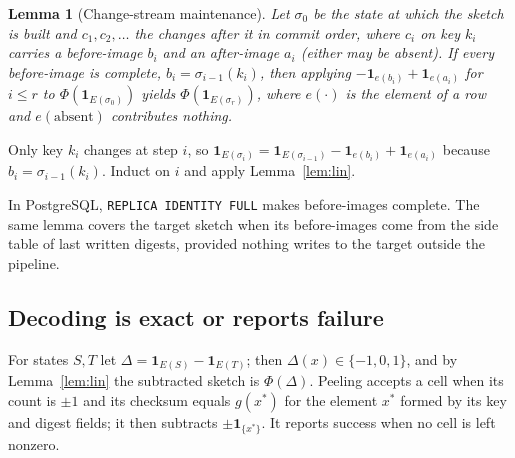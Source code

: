 \documentclass[conference]{IEEEtran}
\newtheorem{lemma}{Lemma}
\begin{document}
\begin{lemma}[Change-stream maintenance]\label{lem:stream}
Let $\sigma_0$ be the state at which the sketch is built and $c_1,c_2,\dots$ the changes after it in commit order, where $c_i$ on key $k_i$ carries a before-image $b_i$ and an after-image $a_i$ (either may be absent). If every before-image is complete, $b_i=\sigma_{i-1}(k_i)$, then applying $-\mathbf 1_{e(b_i)}+\mathbf 1_{e(a_i)}$ for $i\le r$ to $\Phi(\mathbf 1_{E(\sigma_0)})$ yields $\Phi(\mathbf 1_{E(\sigma_r)})$, where $e(\cdot)$ is the element of a row and $e(\text{absent})$ contributes nothing.
\end{lemma}
\begin{IEEEproof}
Only key $k_i$ changes at step $i$, so $\mathbf 1_{E(\sigma_i)}=\mathbf 1_{E(\sigma_{i-1})}-\mathbf 1_{e(b_i)}+\mathbf 1_{e(a_i)}$ because $b_i=\sigma_{i-1}(k_i)$. Induct on $i$ and apply Lemma~\ref{lem:lin}.
\end{IEEEproof}

In PostgreSQL, \texttt{REPLICA IDENTITY FULL} makes before-images complete. The same lemma covers the target sketch when its before-images come from the side table of last written digests, provided nothing writes to the target outside the pipeline.

\subsection{Decoding is exact or reports failure}
For states $S,T$ let $\Delta=\mathbf 1_{E(S)}-\mathbf 1_{E(T)}$; then $\Delta(x)\in\{-1,0,1\}$, and by Lemma~\ref{lem:lin} the subtracted sketch is $\Phi(\Delta)$. Peeling accepts a cell when its count is $\pm1$ and its checksum equals $g(x^\ast)$ for the element $x^\ast$ formed by its key and digest fields; it then subtracts $\pm\mathbf 1_{\{x^\ast\}}$. It reports success when no cell is left nonzero.
\end{document}

